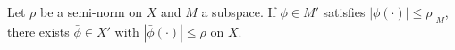 Let $\rho$ be a semi-norm on $X$ and $M$ a subspace. If $\phi\in M'$ satisfies $|\phi(\cdot)|\leqslant\rho|_M$, there exists $\bar{\phi}\in X'$ with $|\bar{\phi}(\cdot)|\leqslant\rho$ on $X$.
